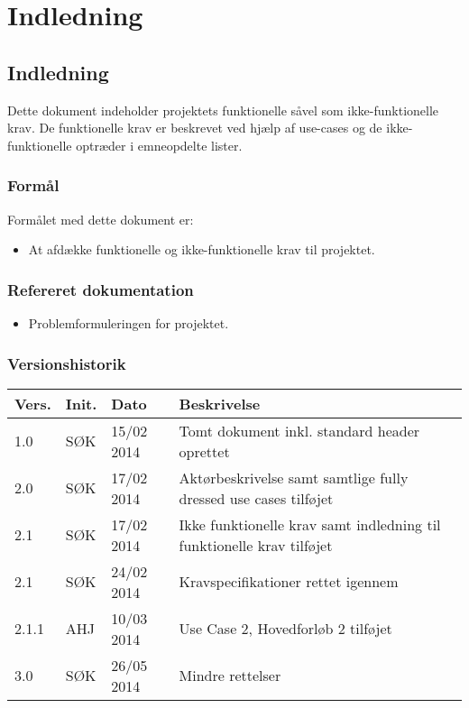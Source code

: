\chapter{Indledning} 
\label{chp:Indledning}
\section{Indledning}
Dette dokument indeholder projektets funktionelle såvel som ikke-funktionelle krav. De funktionelle krav er beskrevet ved hjælp af use-cases og de ikke-funktionelle optræder i emneopdelte lister.

\subsection{Formål}
Formålet med dette dokument er:

\begin{itemize}
\item At afdække funktionelle og ikke-funktionelle krav til projektet.
\end{itemize}

\subsection{Refereret dokumentation}
\begin{itemize}
\item Problemformuleringen for projektet.
\end{itemize}

\subsection{Versionshistorik}
\begin{tabular}{p{2cm}p{2cm}p{2cm}p{8cm}}
\textbf{Vers.} & \textbf{Init.} & \textbf{Dato} & \textbf{Beskrivelse} \\
\hline
1.0 & SØK & 15/02 2014 & Tomt dokument inkl. standard header oprettet \\
2.0 & SØK & 17/02 2014 & Aktørbeskrivelse samt samtlige fully dressed use cases tilføjet \\
2.1 & SØK & 17/02 2014 & Ikke funktionelle krav samt indledning til funktionelle krav tilføjet \\
2.1 & SØK & 24/02 2014 & Kravspecifikationer rettet igennem \\
2.1.1 & AHJ & 10/03 2014 & Use Case 2, Hovedforløb 2 tilføjet \\
3.0 & SØK & 26/05 2014 & Mindre rettelser \\
\hline
\end{tabular}
